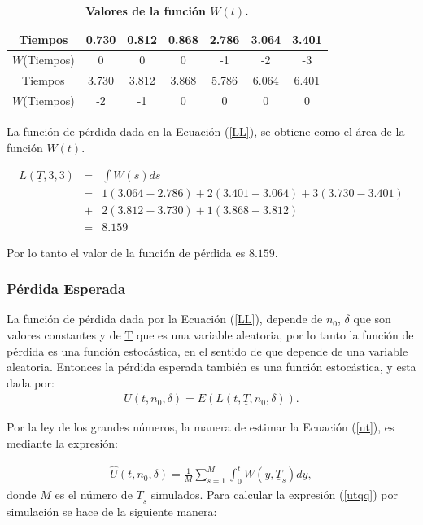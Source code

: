 
\begin{table}[h!]\small
\centering
\caption{\bf Valores de la funci\'on $W(t)$.}\label{dosa}
\begin{tabular}{ccccccc}
\toprule[0.6mm]
Tiempos&0.730& 0.812 & 0.868 &  2.786 &  3.064&  3.401  \\\hline
$W$(Tiempos) & 0  &0      &  0     & -1 &-2  &-3 \\
\hline
Tiempos&3.730 & 3.812 & 3.868 &  5.786 &  6.064&  6.401  \\\hline
$W$(Tiempos) & -2  &-1    &  0     & 0 &0  &0 \\
\toprule[0.6mm]
\end{tabular}

\end{table}

\newpage
 
\noindent  La funci\'on de p\'erdida dada en la Ecuaci\'on (\ref{LL}), se obtiene como el \'area de la funci\'on $W(t)$.

\begin{eqnarray*} 
L(\underline{T},3,3)&=&\int W(s) ds\\
&=& 1( 3.064-2.786)+ 2(3.401-3.064)+3(3.730- 3.401)\\
&+&2( 3.812- 3.730)+ 1(3.868-3.812)\\
&=&8.159
\end{eqnarray*}

\noindent Por lo tanto el valor de la funci\'on de p\'erdida es $8.159$.

\subsubsection{P\'erdida Esperada}

\noindent La funci\'on de p\'erdida dada por la Ecuaci\'on (\ref{LL}), depende de $n_0$, $\delta$ que son valores constantes y de \underline{T} que es una variable aleatoria, por lo tanto la funci\'on de p\'erdida es una funci\'on estoc\'astica, en el sentido de que depende de una variable aleatoria. Entonces la p\'erdida esperada tambi\'en es una funci\'on estoc\'astica, y esta dada por:
\begin{eqnarray}\label{ut}
U(t,n_0,\delta)=E(L(t,\underline{T},n_0, \delta)).
\end{eqnarray}

\noindent Por la ley de los grandes n\'umeros, la manera de estimar la Ecuaci\'on (\ref{ut}), es mediante la  expresi\'on:

\begin{eqnarray}\label{utqq}
\hat{U}(t,n_0,\delta)=\frac{1}{M} \sum_{s=1}^{M}\int_{0}^{t} W(y,\underline{T}_s) dy,
\end{eqnarray}
 donde $M$ es el n\'umero de $\underline{T}_s$ simulados.
\noindent Para calcular la expresi\'on (\ref{utqq}) por simulaci\'on se hace de la siguiente manera:


